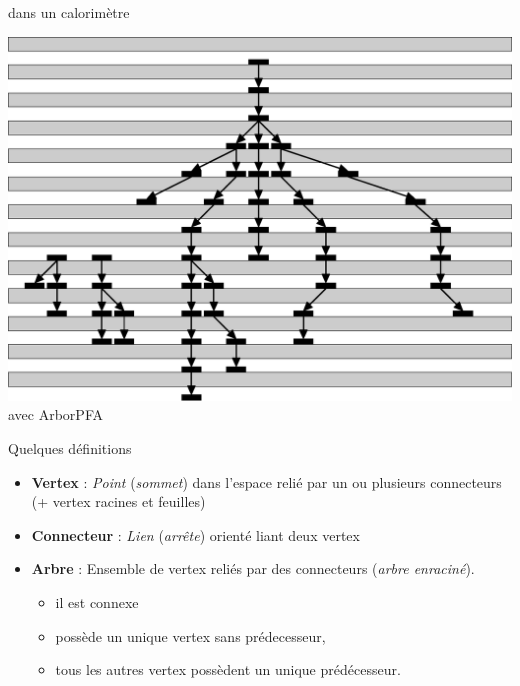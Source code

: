 \documentclass[8pt]{beamer}
\begin{document}
\begin{frame}
\begin{minipage}{0.325\linewidth}
\begin{center}
      dans un calorimètre
    \end{center}
  \end{minipage}\hfill
  \begin{minipage}{0.325\linewidth}
    \begin{center}
      \pause
      \includegraphics[width=\linewidth]{ProtonDecayCalo.pdf} \\
      avec ArborPFA
    \end{center}
  \end{minipage}
  \pause
  \begin{block}{Quelques définitions}
    \begin{itemize}
      \item \textbf{Vertex} : \textit{Point} (\textit{sommet}) dans l'espace relié par un ou plusieurs connecteurs (+ vertex racines et feuilles)
      \item \textbf{Connecteur} : \textit{Lien} (\textit{arrête}) orienté liant deux vertex
      \item \textbf{Arbre} : Ensemble de vertex reliés par des connecteurs (\textit{arbre enraciné}).
      \begin{itemize}
        \item il est connexe
        \item possède un unique vertex sans prédecesseur,
        \item tous les autres vertex possèdent un unique prédécesseur.
      \end{itemize}
    \end{itemize}
  \end{block}
  \end{frame}
\end{document}
